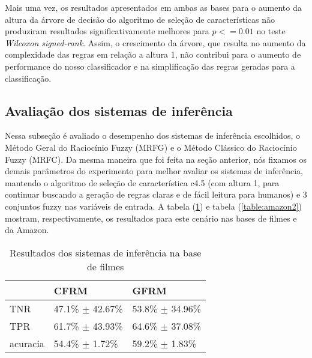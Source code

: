 \documentclass[template.tex]{subfiles}
\begin{document}

%
%
%

Mais uma vez, os resultados apresentados em ambas as bases para o aumento da altura da árvore de decisão do algoritmo de seleção de características não produziram resultados significativamente melhores para $p <= 0.01$ no teste \textit{Wilcoxon signed-rank}.  Assim, o crescimento da árvore, que resulta no aumento da complexidade das regras em relação a altura 1, não contribui para o aumento de performance do nosso classificador e na simplificação das regras geradas para a classificação. 

\subsection{Avaliação dos sistemas de inferência}

Nessa subseção é avaliado o desempenho dos sistemas de inferência escolhidos, o Método Geral do Raciocínio Fuzzy (MRFG) e o Método Clássico do Raciocínio Fuzzy (MRFC). Da mesma maneira que foi feita na seção anterior, nós fixamos os demais parâmetros do experimento para melhor avaliar os sistemas de inferência, mantendo o algoritmo de seleção de característica c4.5 (com altura 1, para continuar buscando a geração de regras claras e de fácil leitura para humanos) e 3 conjuntos fuzzy nas variáveis de entrada. A tabela (\ref{table:movies2}) e tabela (\ref{table:amazon2}) mostram, respectivamente, os resultados para este cenário nas bases de filmes e da Amazon.

\begin{table}[!h]
    \begin{tabular}{lll}
    ~                   & CFRM                              & GFRM \\ \hline
    TNR                 & 47.1\% $\pm$ 42.67\%   & 53.8\% $\pm$ 34.96\%    \\
    TPR             & 61.7\% $\pm$ 43.93\%   & 64.6\% $\pm$ 37.08\%   \\
    acuracia        & 54.4\% $\pm$ 1.72\%       & 59.2\% $\pm$ 1.83\%    \\
    \end{tabular}
    \caption{Resultados dos sistemas de inferência na base de filmes}
    \label{table:movies2}
\end{table}
\end{document}

